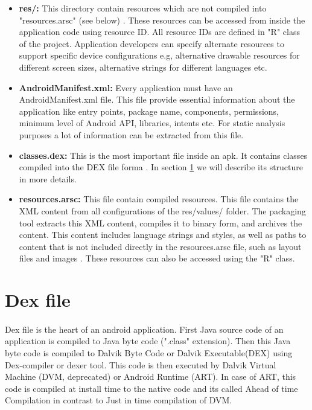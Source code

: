 \documentclass[../main.tex]{subfile}
\begin{document}
\begin{itemize}
			\item \textbf{res/:} This directory contain resources which are not compiled into "resources.arsc" (see below) \cite{APK_structure}. These resources can be accessed from inside the application code using resource ID. All resource IDs are defined in "R" class of the project. Application developers can specify alternate resources to support specific device configurations e.g, alternative drawable resources for different screen sizes, alternative strings for different languages etc.
			
			\item \textbf{AndroidManifest.xml:} Every application must have an AndroidManifest.xml file. This file provide essential information about the application like entry points, package name, components, permissions, minimum level of Android API, libraries, intents etc. For static analysis purposes a lot of information can be extracted from this file.
			
			\item \textbf{classes.dex:} This is the most important file inside an apk. It contains classes compiled into the DEX file forma \cite{dex_format}. In section \ref{sec:dex} we will describe its structure in more details.
			
			\item \textbf{resources.arsc:} This file contain compiled resources. This file contains the XML content from all configurations of the res/values/ folder. The packaging tool extracts this XML content, compiles it to binary form, and archives the content. This content includes language strings and styles, as well as paths to content that is not included directly in the resources.arsc file, such as layout files and images \cite{APK_structure}. These resources can also be accessed using the "R" class.
		\end{itemize}
		

	\section{Dex file}\label{sec:dex}
		\paragraph{} Dex file is the heart of an android application. First Java source code of an application is compiled to Java byte code (".class" extension). Then this Java byte code is compiled to Dalvik Byte Code or Dalvik Executable(DEX) using Dex-compiler or dexer tool. This code is then executed by Dalvik Virtual Machine (DVM, deprecated) or Android Runtime (ART). In case of ART, this code is compiled at install time to the native code and its called Ahead of time Compilation in contrast to Just in time compilation of DVM.
\end{document}
